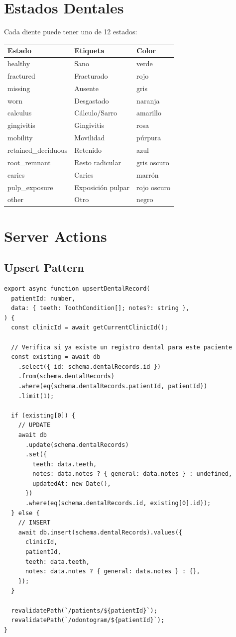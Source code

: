 \section{Estados Dentales}

Cada diente puede tener uno de 12 estados:

\begin{longtable}{|l|l|l|}
\hline
\textbf{Estado} & \textbf{Etiqueta} & \textbf{Color} \\
\hline
healthy & Sano & verde \\
fractured & Fracturado & rojo \\
missing & Ausente & gris \\
worn & Desgastado & naranja \\
calculus & C\'alculo/Sarro & amarillo \\
gingivitis & Gingivitis & rosa \\
mobility & Movilidad & p\'urpura \\
retained\_deciduous & Retenido & azul \\
root\_remnant & Resto radicular & gris oscuro \\
caries & Caries & marr\'on \\
pulp\_exposure & Exposici\'on pulpar & rojo oscuro \\
other & Otro & negro \\
\hline
\end{longtable}

\section{Server Actions}

\subsection{Upsert Pattern}

\begin{lstlisting}[style=typescript, caption=upsertDentalRecord - Inserta o actualiza segun exista]
export async function upsertDentalRecord(
  patientId: number,
  data: { teeth: ToothCondition[]; notes?: string },
) {
  const clinicId = await getCurrentClinicId();

  // Verifica si ya existe un registro dental para este paciente
  const existing = await db
    .select({ id: schema.dentalRecords.id })
    .from(schema.dentalRecords)
    .where(eq(schema.dentalRecords.patientId, patientId))
    .limit(1);

  if (existing[0]) {
    // UPDATE
    await db
      .update(schema.dentalRecords)
      .set({
        teeth: data.teeth,
        notes: data.notes ? { general: data.notes } : undefined,
        updatedAt: new Date(),
      })
      .where(eq(schema.dentalRecords.id, existing[0].id));
  } else {
    // INSERT
    await db.insert(schema.dentalRecords).values({
      clinicId,
      patientId,
      teeth: data.teeth,
      notes: data.notes ? { general: data.notes } : {},
    });
  }

  revalidatePath(`/patients/${patientId}`);
  revalidatePath(`/odontogram/${patientId}`);
}
\end{lstlisting}

